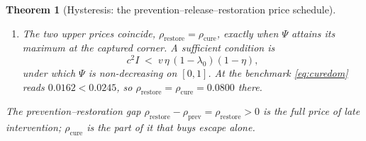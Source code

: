 \documentclass[11pt]{article}
\newtheorem{theorem}{Theorem}[section]
\theoremstyle{definition}
\theoremstyle{remark}
\numberwithin{equation}{section}
\begin{document}
\begin{theorem}[Hysteresis: the prevention--release--restoration price schedule]
\begin{enumerate}
\item[(iv)] The two upper prices coincide, $\rho_{\mathrm{restore}} = \rho_{\mathrm{cure}}$, exactly when $\Psi$ attains its maximum at the captured corner. A sufficient condition is
\begin{equation}\label{eq:curedom}
c^2 I \;<\; v\,\eta\,(1-\lambda_0)(1-\eta),
\end{equation}
under which $\Psi$ is non-decreasing on $[0,1]$. At the benchmark \eqref{eq:curedom} reads $0.0162 < 0.0245$, so $\rho_{\mathrm{restore}} = \rho_{\mathrm{cure}} = 0.0800$ there.
\end{enumerate}
The prevention--restoration gap $\rho_{\mathrm{restore}} - \rho_{\mathrm{prev}} = \rho_{\mathrm{restore}} > 0$ is the full price of late intervention; $\rho_{\mathrm{cure}}$ is the part of it that buys escape alone.
\end{theorem}
\end{document}
